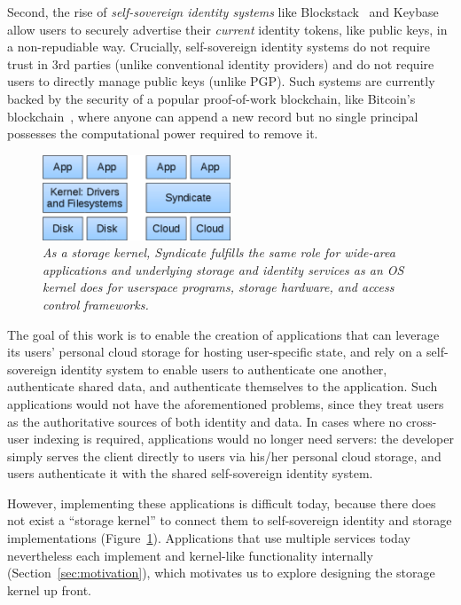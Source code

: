 Second, the rise of \textit{self-sovereign identity systems} like
Blockstack~\cite{blockstack} and Keybase~\cite{keybase} allow users to
securely advertise their \textit{current} identity tokens, like public keys, in a
non-repudiable way.  Crucially, self-sovereign identity systems do not
require trust in 3rd parties (unlike conventional identity providers)
and do not require users to directly manage public keys (unlike PGP).
Such systems are currently backed by the security of a popular proof-of-work blockchain, like
Bitcoin's blockchain~\cite{bitcoin}, where anyone can append a new record
but no single principal possesses the computational power required to remove it.

\begin{figure}[h!]
\centering
\includegraphics[width=0.5\textwidth]{figures/kernel}
\caption{\it As a storage kernel, Syndicate fulfills the same role for wide-area
applications and underlying storage and identity services as an OS kernel does
   for userspace programs, storage hardware, and access control frameworks.}
\label{fig:kernel}
\end{figure}

The goal of this work is to enable the creation of applications that can
leverage its users' personal cloud storage for hosting user-specific state, and
rely on a self-sovereign identity system to enable users to authenticate one
another, authenticate shared data, and authenticate themselves to the application.
Such applications would not have the aforementioned problems, since they
treat users as the authoritative sources of both identity and data.  In cases
where no cross-user indexing is required, applications would no longer need
servers:  the developer simply serves the client directly to users via his/her
personal cloud storage, and users authenticate it with the shared self-sovereign
identity system.

However, implementing these applications is difficult today,
because there does not exist a ``storage kernel'' to connect them to
self-sovereign identity and storage implementations (Figure~\ref{fig:kernel}).
Applications that use multiple services today nevertheless each implement and
kernel-like functionality internally (Section~\ref{sec:motivation}), which motivates us to
explore designing the storage kernel up front.

